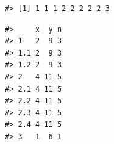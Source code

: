 \documentclass[]{book}
\newenvironment{Shaded}{\begin{snugshade}}{\end{snugshade}}
\newcommand{\KeywordTok}[1]{\textcolor[rgb]{0.13,0.29,0.53}{\textbf{#1}}}
\newcommand{\DecValTok}[1]{\textcolor[rgb]{0.00,0.00,0.81}{#1}}
\newcommand{\OperatorTok}[1]{\textcolor[rgb]{0.81,0.36,0.00}{\textbf{#1}}}
\newcommand{\NormalTok}[1]{#1}
\theoremstyle{definition}
\theoremstyle{definition}
\theoremstyle{definition}
\theoremstyle{remark}
\begin{document}
\begin{verbatim}
#> [1] 1 1 1 2 2 2 2 2 3
\end{verbatim}

\begin{Shaded}
\end{Shaded}

\begin{verbatim}
#>     x  y n
#> 1   2  9 3
#> 1.1 2  9 3
#> 1.2 2  9 3
#> 2   4 11 5
#> 2.1 4 11 5
#> 2.2 4 11 5
#> 2.3 4 11 5
#> 2.4 4 11 5
#> 3   1  6 1
\end{verbatim}


\end{document}
